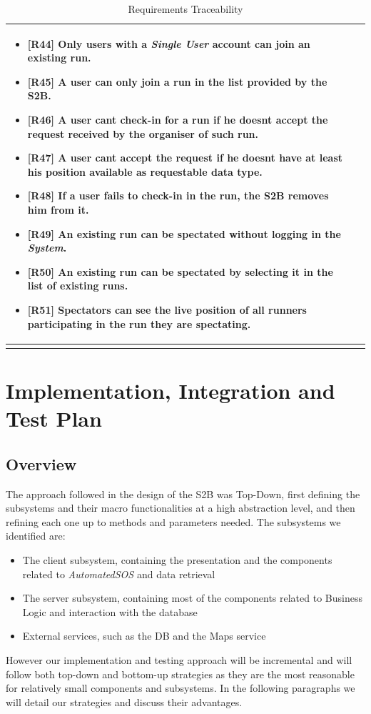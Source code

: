 \documentclass[titlepage]{article}
\begin{document}
\begin{longtable}{| p{5 cm} | p{8 cm} |}
\begin{itemize}
			\item {\bf [R44]} Only users with a {\it Single User} account can join an existing run.
			\item {\bf [R45]} A user can only join a run in the list provided by the S2B.
			\item {\bf [R46]} A user can\textsc{\char13}t check-in for a run if he doesn\textsc{\char13}t accept the request received by the organiser of such run.
			\item {\bf [R47]} A user can\textsc{\char13}t accept the request if he doesn\textsc{\char13}t have at least his position available as requestable data type.
			\item {\bf [R48]} If a user fails to check-in in the run, the S2B removes him from it.
			\item {\bf [R49]} An existing run can be spectated without logging in the {\it System}.
			\item {\bf [R50]} An existing run can be spectated by selecting it in the list of existing runs.
			\item {\bf [R51]} Spectators can see the live position of all runners participating in the run they are spectating.
		\end{itemize}		
		\\	 \hline		
		\caption{Requirements Traceability}	
		
	\end{longtable}
	
	\pagebreak
	
	\section{Implementation, Integration and Test Plan}
	\subsection{Overview}
	The approach followed in the design of the S2B was Top-Down, first defining the subsystems and their macro functionalities at a high abstraction level, and then refining each one up to methods and parameters needed. 
	The subsystems we identified are:
	\begin{itemize}
		\item The client subsystem, containing the presentation and the components related to {\it AutomatedSOS} and data retrieval
		\item The server subsystem, containing most of the components related to Business Logic and interaction with the database
		\item External services, such as the DB and the Maps service
	\end{itemize}
	However our implementation and testing approach will be incremental and will follow both top-down and bottom-up strategies as they are the most reasonable for relatively small components and subsystems. In the following paragraphs we will detail our strategies and discuss their advantages. 
	
\end{document}
